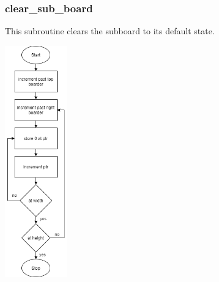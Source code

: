 \documentclass{article}
\begin{document}
    \subsubsection{clear\_sub\_board}
        This subroutine clears the subboard to its default state.
        \begin{center}
            {\includegraphics[height=10cm]{clear_sub_board.png}\centering} 
        \end{center}
        \newpage 
        
\end{document}

